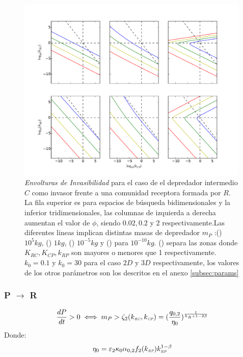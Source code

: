 \begin{figure}
  \centering
  \includegraphics[width = 0.99\textwidth]{./Plots/Z(IC2)AcGrGr.pdf}
  \caption[Env $Z(IC2)$]{\emph{Envolturas de Invasibilidad} para el caso de el depredador intermedio $C$ como invasor frente a una comunidad receptora formada por $R$. La fila superior es para espacios de b\'usqueda bidimensionales y la inferior tridimensionales, las columnas de izquierda a derecha aumentan el valor de $\phi$, siendo $0.02,0.2$ y $2$ respectivamente.Las diferentes lineas implican distintas masas de depredador $m_P$ :({\hwplotR}) $10^5 kg$,  ({\hwplotY}) $1kg$, ({\hwplotG}) $10^{-5}kg$ y ({\hwplotB}) para $10^{-10}kg$. ({\hwplotK}) separa las zonas donde $K_{RC},K_{CP},k_{RP}$ son mayores o menores que 1 respectivamente. $k_0 = 0.1$ y $k_0 = 30$ para el caso $2D$ y $3D$ respectivamente, los valores de los otros par\'ametros son los descritos en el anexo \ref{subsec:params}}
  \label{fig:Z(IC2)}
\end{figure}

\subsubsection{P $\to$ R}

\begin{equation}
  \frac{dP}{dt} >0 \iff  m_P > \zeta_2(k_{\textit{\tiny RC}},k_{\textit{\tiny CP}}) = (\frac{q_{0,2}}{\eta_0})^{\frac{1}{h_R +1 - 2\beta}}
\end{equation}
Donde:
\begin{equation}
  \begin{aligned}
    \eta_0 &= \varepsilon_2 \kappa_0\alpha_{0,2} f_2(k_{\textit{\tiny RP}})k_{\textit{\tiny RP}}^{1-\beta} \\
  \end{aligned}
\end{equation}

